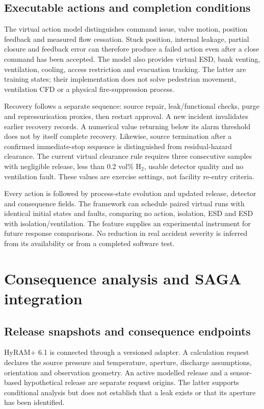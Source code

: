 \documentclass[12pt,a4paper]{article}
\begin{document}
\subsection{Executable actions and completion conditions}
The virtual action model distinguishes command issue, valve motion, position
feedback and measured flow cessation. Stuck position, internal leakage,
partial closure and feedback error can therefore produce a failed action even
after a close command has been accepted. The model also provides virtual ESD,
bank venting, ventilation, cooling, access restriction and evacuation tracking.
The latter are training states; their implementation does not solve pedestrian
movement, ventilation CFD or a physical fire-suppression process.

Recovery follows a separate sequence: source repair, leak/functional checks,
purge and repressurisation proxies, then restart approval. A new incident
invalidates earlier recovery records. A numerical value returning below its
alarm threshold does not by itself complete recovery. Likewise, source
termination after a confirmed immediate-stop sequence is distinguished from
residual-hazard clearance. The current virtual clearance rule requires three
consecutive samples with negligible release, less than 0.2 vol\% H$_2$,
usable detector quality and no ventilation fault. These values are exercise
settings, not facility re-entry criteria.

Every action is followed by process-state evolution and updated release,
detector and consequence fields. The framework can schedule paired virtual
runs with identical initial states and faults, comparing no action, isolation,
ESD and ESD with isolation/ventilation. The feature supplies an experimental
instrument for future response comparisons. No reduction in real accident
severity is inferred from its availability or from a completed software test.

\section{Consequence analysis and SAGA integration}
\subsection{Release snapshots and consequence endpoints}
HyRAM+ 6.1 is connected through a versioned adapter. A calculation request
declares the source pressure and temperature, aperture, discharge assumptions,
orientation and observation geometry. An active modelled release and a
sensor-based hypothetical release are separate request origins. The latter
supports conditional analysis but does not establish that a leak exists or that
its aperture has been identified.
\end{document}
